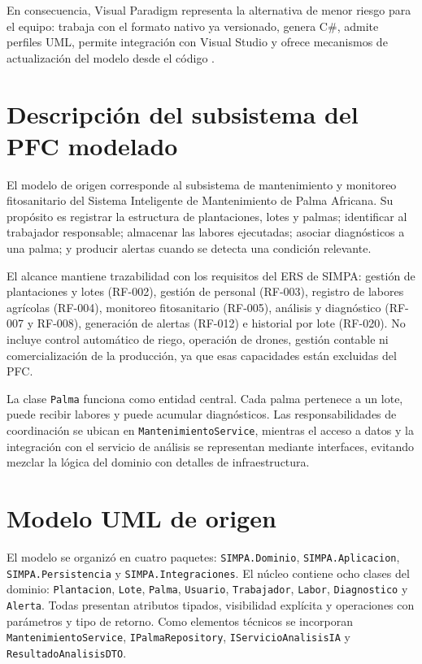 \documentclass[11pt,a4paper]{article}
\begin{document}
En consecuencia, Visual Paradigm representa la alternativa de menor riesgo para el equipo:
trabaja con el formato nativo ya versionado, genera C\#, admite perfiles UML, permite
integración con Visual Studio y ofrece mecanismos de actualización del modelo desde el
código \cite{vpVisualStudioGeneration,vpVisualStudioReverse}.


\section{Descripción del subsistema del PFC modelado}

El modelo de origen corresponde al subsistema de mantenimiento y monitoreo fitosanitario
del Sistema Inteligente de Mantenimiento de Palma Africana. Su propósito es registrar la
estructura de plantaciones, lotes y palmas; identificar al trabajador responsable; almacenar
las labores ejecutadas; asociar diagnósticos a una palma; y producir alertas cuando se
detecta una condición relevante.

El alcance mantiene trazabilidad con los requisitos del ERS de SIMPA: gestión de
plantaciones y lotes (RF-002), gestión de personal (RF-003), registro de labores agrícolas
(RF-004), monitoreo fitosanitario (RF-005), análisis y diagnóstico (RF-007 y RF-008),
generación de alertas (RF-012) e historial por lote (RF-020). No incluye control automático
de riego, operación de drones, gestión contable ni comercialización de la producción, ya
que esas capacidades están excluidas del PFC.

La clase \texttt{Palma} funciona como entidad central. Cada palma pertenece a un lote, puede
recibir labores y puede acumular diagnósticos. Las responsabilidades de coordinación se
ubican en \texttt{MantenimientoService}, mientras el acceso a datos y la integración con el
servicio de análisis se representan mediante interfaces, evitando mezclar la lógica del
dominio con detalles de infraestructura.


\section{Modelo UML de origen}

El modelo se organizó en cuatro paquetes: \texttt{SIMPA.Dominio},
\texttt{SIMPA.Aplicacion}, \texttt{SIMPA.Persistencia} y
\texttt{SIMPA.Integraciones}. El núcleo contiene ocho clases del dominio:
\texttt{Plantacion}, \texttt{Lote}, \texttt{Palma}, \texttt{Usuario},
\texttt{Trabajador}, \texttt{Labor}, \texttt{Diagnostico} y \texttt{Alerta}.
Todas presentan atributos tipados, visibilidad explícita y operaciones con parámetros y
tipo de retorno. Como elementos técnicos se incorporan
\texttt{MantenimientoService}, \texttt{IPalmaRepository},
\texttt{IServicioAnalisisIA} y \texttt{ResultadoAnalisisDTO}.
\end{document}
